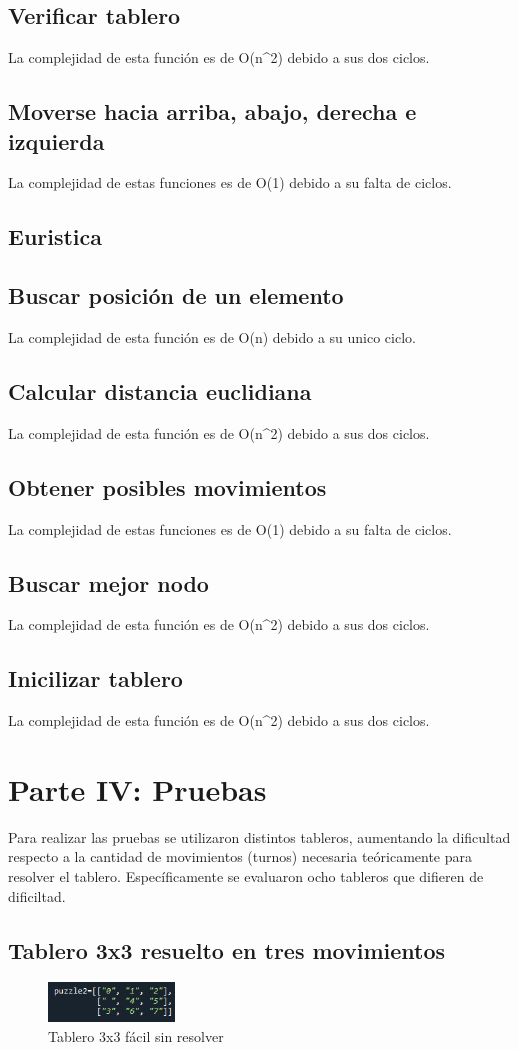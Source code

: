 \documentclass{article}
\begin{document}
\subsection{Verificar tablero}
La complejidad de esta función es de O(n^2) debido a sus dos ciclos.
\subsection{Moverse hacia arriba, abajo, derecha e izquierda}
La complejidad de estas funciones es de O(1) debido a su falta de ciclos.
\subsection{Euristica}
\subsection{Buscar posición de un elemento}
La complejidad de esta función es de O(n) debido a su unico ciclo.
\subsection{Calcular distancia euclidiana}
La complejidad de esta función es de O(n^2) debido a sus dos ciclos.
\subsection{Obtener posibles movimientos}
La complejidad de estas funciones es de O(1) debido a su falta de ciclos.
\subsection{Buscar mejor nodo}
La complejidad de esta función es de O(n^2) debido a sus dos ciclos.
\subsection{Inicilizar tablero}
La complejidad de esta función es de O(n^2) debido a sus dos ciclos.

\section{Parte IV: Pruebas}
Para realizar las pruebas se utilizaron distintos tableros, aumentando la dificultad respecto a la cantidad de movimientos (turnos) necesaria teóricamente para resolver el tablero. Específicamente se evaluaron ocho tableros que difieren de dificiltad.
    \subsection{Tablero 3x3 resuelto en tres movimientos}
        \begin{figure}[H]
        \centering
        \includegraphics[width=0.3\textwidth]{puzzles/puzzle.PNG}
        \caption{Tablero 3x3 fácil sin resolver}
        \label{fig:ger}
        \end{figure}
        
\end{document}
